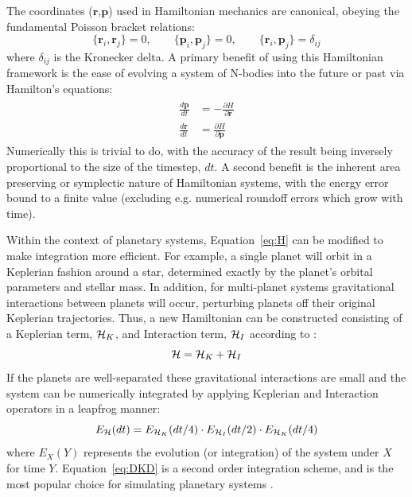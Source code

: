 The coordinates ($\textbf{r}$,$\textbf{p}$) used in Hamiltonian mechanics are canonical, obeying the fundamental Poisson bracket relations:
\begin{equation}
\{\textbf{r}_i, \textbf{r}_j\} = 0, \qquad
\{\textbf{p}_i, \textbf{p}_j\} = 0, \qquad
\{\textbf{r}_i, \textbf{p}_j\} = \delta_{ij}
\end{equation}
where $\delta_{ij}$ is the Kronecker delta. 
A primary benefit of using this Hamiltonian framework is the ease of evolving a system of N-bodies into the future or past via Hamilton's equations:
\begin{align}
\begin{split}
\frac{d\textbf{p}}{dt} &= -\frac{\partial H}{\partial \textbf{r}} \\
\frac{d\textbf{r}}{dt} &= \frac{\partial H}{\partial \textbf{p}} 
\label{eq:Heq}
\end{split}
\end{align}
Numerically this is trivial to do, with the accuracy of the result being inversely proportional to the size of the timestep, $dt$.
A second benefit is the inherent area preserving or symplectic nature of Hamiltonian systems, with the energy error bound to a finite value (excluding e.g. numerical roundoff errors which grow with time).

Within the context of planetary systems, Equation~\ref{eq:H} can be modified to make integration more efficient.
For example, a single planet will orbit in a Keplerian fashion around a star, determined exactly by the planet's orbital parameters and stellar mass. 
In addition, for multi-planet systems gravitational interactions between planets will occur, perturbing planets off their original Keplerian trajectories.
Thus, a new Hamiltonian can be constructed consisting of a Keplerian term, $\mathcal{H}_K$, and Interaction term, $\mathcal{H}_I$ according to \citep{Wisdom1991}:
\begin{equation*}
\mathcal{H} = \mathcal{H}_K + \mathcal{H}_I
\end{equation*}
If the planets are well-separated these gravitational interactions are small and the system can be numerically integrated by applying Keplerian and Interaction operators in a leapfrog manner:
\begin{equation}
E_{\mathcal{H}}(dt) = E_{\mathcal{H}_K}(dt/4) \cdot E_{\mathcal{H}_I}(dt/2) \cdot E_{\mathcal{H}_K}(dt/4)
\label{eq:DKD}
\end{equation}
where $E_{X}(Y)$ represents the evolution (or integration) of the system under $X$ for time $Y$.
Equation~\ref{eq:DKD} is a second order integration scheme, and is the most popular choice for simulating planetary systems \citep{Wisdom1991}.

